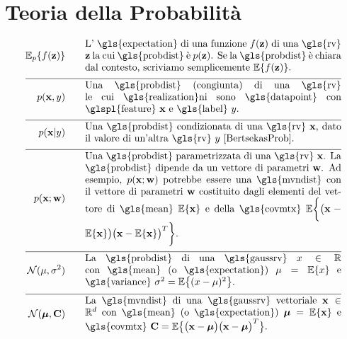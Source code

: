 \newpage
\section*{Teoria della Probabilità} 
\begin{align}
	\expect_{p} \{ f(\datapoint) \}  \quad\quad & \parbox{.75\textwidth}{L' \gls{expectation} di una funzione $f(\datapoint)$ di una \gls{rv} 
		$\datapoint$ la cui \gls{probdist} è $\prob{\datapoint}$. Se la \gls{probdist} è chiara dal contesto, scriviamo semplicemente $\expect \{ f(\datapoint) \}$. }  \nonumber \\[2mm] \hline \nonumber\\[-5mm]    
	\prob{\featurevec,\truelabel} \quad\quad & \parbox{.75\textwidth}{Una \gls{probdist} (congiunta) di una \gls{rv} 
		le cui \gls{realization}ni  sono \gls{datapoint} con \glspl{feature} $\featurevec$ e \gls{label} $\truelabel$.} \nonumber        \nonumber \\[2mm] \hline \nonumber\\[-5mm]        
	\prob{\featurevec|\truelabel} \quad\quad & \parbox{.75\textwidth}{Una \gls{probdist} condizionata di una \gls{rv} 
		$\featurevec$, dato il valore di un'altra \gls{rv} $\truelabel$ \cite[Sec.\ 3.5]{BertsekasProb}. } \nonumber       \nonumber \\[2mm] \hline \nonumber\\[-5mm]           
	\prob{\featurevec;\weights} \quad\quad & \parbox{.75\textwidth}{Una \gls{probdist} parametrizzata di una \gls{rv} $\featurevec$. 
		La \gls{probdist} dipende da un vettore di parametri $\weights$. Ad esempio, $\prob{\featurevec;\weights}$ potrebbe essere una
		\gls{mvndist} con il vettore di parametri $\weights$ costituito dagli elementi del vettore di \gls{mean} $\expect \{ \featurevec \}$ 
		e della \gls{covmtx} $\expect \bigg \{ \big( \featurevec - \expect \{ \featurevec \}\big) \big( \featurevec - \expect \{ \featurevec \}\big)^{T}  \bigg\}$.} \nonumber           \nonumber \\[2mm] \hline \nonumber\\[-5mm]
	\mathcal{N}(\mu, \sigma^{2}) \quad\quad & \parbox{.75\textwidth}{La \gls{probdist} di una 
		\gls{gaussrv} $\feature \in \mathbb{R}$ con \gls{mean} (o \gls{expectation}) $\mu= \expect \{ \feature \}$ 
		e \gls{variance} $\sigma^{2} =   \expect \big\{  (  \feature - \mu )^2 \big\}$.} \nonumber    \nonumber \\[2mm] \hline \nonumber\\[-5mm]
	\mathcal{N}(\clustermean, \mathbf{C}) \quad\quad & \parbox{.75\textwidth}{La \gls{mvndist} di una		\gls{gaussrv} vettoriale $\featurevec \in \mathbb{R}^{\featuredim}$ con \gls{mean} (o \gls{expectation}) $\clustermean= \expect \{ \featurevec \}$ 
		e \gls{covmtx} $\mathbf{C} =  \expect \big\{ \big( \featurevec - \clustermean \big)\big( \featurevec - \clustermean \big)^{T} \big\}$.} \nonumber                                             
\end{align}





